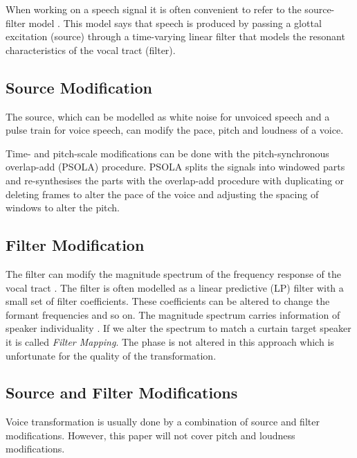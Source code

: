 When working on a speech signal it is often convenient to refer to the source-filter model \cite{taletek}. This model says that speech is produced by passing a glottal excitation (source) through a time-varying linear filter that models the resonant characteristics of the vocal tract (filter).

\subsection{Source Modification} %
\label{sub:source_modification}
The source, which can be modelled as white noise for unvoiced speech and a pulse train for voice speech, can modify the pace, pitch and loudness of a voice. 

Time- and pitch-scale modifications can be done with the pitch-synchronous overlap-add (PSOLA) procedure. PSOLA splits the signals into windowed parts and re-synthesises the parts with the overlap-add procedure with duplicating or deleting frames to alter the pace of the voice and adjusting the spacing of windows to alter the pitch.

\subsection{Filter Modification} %
\label{sub:filter_modification}
The filter can modify the magnitude spectrum of the frequency response of the vocal tract \cite{nguyen09}. The filter is often modelled as a linear predictive (LP) filter with a small set of filter coefficients. These coefficients can be altered to change the formant frequencies and so on. The magnitude spectrum carries information of speaker individuality \cite{stylianou09}. If we alter the spectrum to match a curtain target speaker it is called \emph{Filter Mapping}. The phase is not altered in this approach which is unfortunate for the quality of the transformation.   

\subsection{Source and Filter Modifications} %
\label{sub:source_and_filter_modifications}
Voice transformation is usually done by a combination of source and filter modifications. However, this paper will not cover pitch and loudness modifications.

